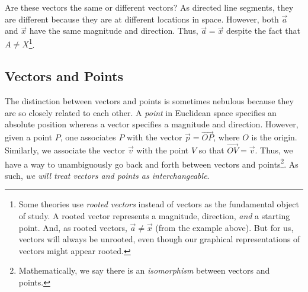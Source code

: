 \begin{center}
	\usetikzlibrary{patterns,decorations.pathreplacing}
\end{center}

Are these vectors
the same or different vectors?  As directed line segments,
they are different because they are at different locations in space.  
However, both $\vec a$ and $\vec x$ have the same
magnitude and direction.  Thus, $\vec a=\vec x$ despite the fact that $A\neq X$\footnote{
	Some theories use \emph{rooted vectors} instead of
	vectors as the fundamental object of study. A rooted vector
	represents a magnitude, direction, \emph{and} a starting point. And, 
	as rooted vectors, $\vec a\neq \vec x$ (from the example above).
	But for us, vectors will always be unrooted, even though our graphical
	representations of vectors might appear rooted.
}.


\subsection{Vectors and Points}
The distinction between vectors and points is sometimes nebulous because
they are so closely related to each other.  A \emph{point}
in Euclidean space specifies an absolute position whereas a vector
specifies a magnitude and direction.  However, given a point $P$,
one associates $P$ with the vector $\vec p=\overrightarrow{OP}$, where $O$
is the origin.  Similarly, we associate the vector $\vec v$ with
the point $V$ so that $\overrightarrow{OV}=\vec v$.
Thus, we have a way to unambiguously go back and forth between vectors and
points\footnote{ Mathematically, we say there is an \emph{isomorphism} between
vectors and points.}.  As such, \emph{we will treat vectors and points
as interchangeable}.


